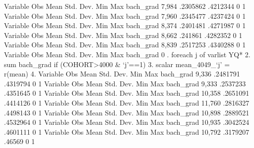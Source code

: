 {\smallskip}
    Variable {\VBAR}        Obs        Mean    Std. Dev.       Min        Max
   bach_grad {\VBAR}      7,984    .2305862    .4212344          0          1
{\smallskip}
    Variable {\VBAR}        Obs        Mean    Std. Dev.       Min        Max
   bach_grad {\VBAR}      7,960    .2345477    .4237424          0          1
{\smallskip}
    Variable {\VBAR}        Obs        Mean    Std. Dev.       Min        Max
   bach_grad {\VBAR}      8,374    .2401481    .4271987          0          1
{\smallskip}
    Variable {\VBAR}        Obs        Mean    Std. Dev.       Min        Max
   bach_grad {\VBAR}      8,662     .241861    .4282352          0          1
{\smallskip}
    Variable {\VBAR}        Obs        Mean    Std. Dev.       Min        Max
   bach_grad {\VBAR}      8,839    .2517253    .4340288          0          1
{\smallskip}
    Variable {\VBAR}        Obs        Mean    Std. Dev.       Min        Max
   bach_grad {\VBAR}          0
{\smallskip}
. foreach j of varlist YQ* {\lbr}
  2.                 sum bach_grad if (COHORT>4000 \& `j'==1)
  3.                 scalar mean_4049_`j' = r(mean)
  4. {\rbr}
{\smallskip}
    Variable {\VBAR}        Obs        Mean    Std. Dev.       Min        Max
   bach_grad {\VBAR}      9,336    .2481791    .4319794          0          1
{\smallskip}
    Variable {\VBAR}        Obs        Mean    Std. Dev.       Min        Max
   bach_grad {\VBAR}      9,333    .2537233    .4351645          0          1
{\smallskip}
    Variable {\VBAR}        Obs        Mean    Std. Dev.       Min        Max
   bach_grad {\VBAR}     10,358    .2651091    .4414126          0          1
{\smallskip}
    Variable {\VBAR}        Obs        Mean    Std. Dev.       Min        Max
   bach_grad {\VBAR}     11,760    .2816327    .4498143          0          1
{\smallskip}
    Variable {\VBAR}        Obs        Mean    Std. Dev.       Min        Max
   bach_grad {\VBAR}     10,898    .2889521    .4532964          0          1
{\smallskip}
    Variable {\VBAR}        Obs        Mean    Std. Dev.       Min        Max
   bach_grad {\VBAR}     10,935    .3042524    .4601111          0          1
{\smallskip}
    Variable {\VBAR}        Obs        Mean    Std. Dev.       Min        Max
   bach_grad {\VBAR}     10,792    .3179207      .46569          0          1

